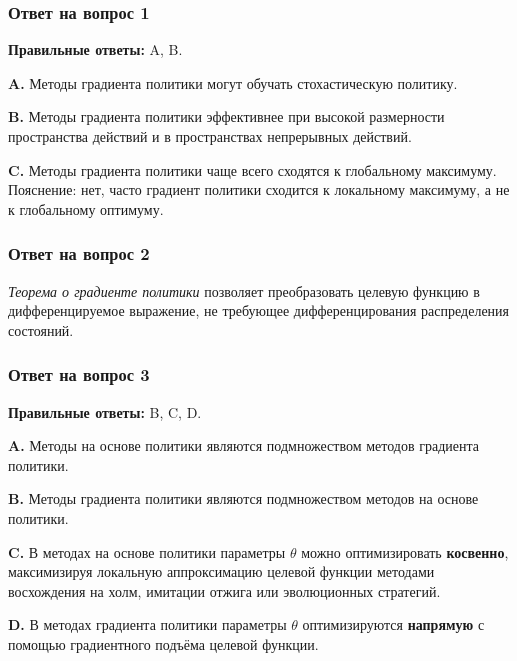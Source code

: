 \documentclass[11pt,a4paper]{article}
\begin{document}
\subsubsection{Ответ на вопрос 1}\label{q1-solution}

\textbf{Правильные ответы:} A, B.

\textbf{A.} Методы градиента политики могут обучать стохастическую политику.

\textbf{B.} Методы градиента политики эффективнее при высокой размерности пространства действий и в пространствах непрерывных действий.

\textbf{C.} Методы градиента политики чаще всего сходятся к глобальному максимуму. Пояснение: нет, часто градиент политики сходится к локальному максимуму, а не к глобальному оптимуму.

\subsubsection{Ответ на вопрос 2}\label{q2-solution}

\emph{Теорема о градиенте политики} позволяет преобразовать целевую функцию в дифференцируемое выражение, не требующее дифференцирования распределения состояний.


\subsubsection{Ответ на вопрос 3}\label{q3-solution}

\textbf{Правильные ответы:} B, C, D.

\textbf{A.} Методы на основе политики являются подмножеством методов градиента политики.

\textbf{B.} Методы градиента политики являются подмножеством методов на основе политики.

\textbf{C.} В методах на основе политики параметры \(\theta\) можно оптимизировать \textbf{косвенно}, максимизируя локальную аппроксимацию целевой функции методами восхождения на холм, имитации отжига или эволюционных стратегий.

\textbf{D.} В методах градиента политики параметры \(\theta\) оптимизируются \textbf{напрямую} с помощью градиентного подъёма целевой функции.
\end{document}
